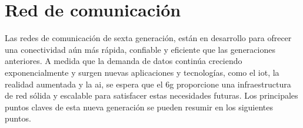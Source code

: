 \section{Red de comunicación }
\label{sec:6g}

Las redes de comunicación de sexta generación, están en desarrollo para ofrecer una conectividad aún más rápida, confiable y eficiente que las generaciones anteriores. A medida que la demanda de datos continúa creciendo exponencialmente y surgen nuevas aplicaciones y tecnologías, como el \gls{iot}, la realidad aumentada y la \gls{ai}, se espera que el \gls{6g} proporcione una infraestructura de red sólida y escalable para satisfacer estas necesidades futuras. Los principales puntos claves de esta nueva generación se pueden resumir en los siguientes puntos.

